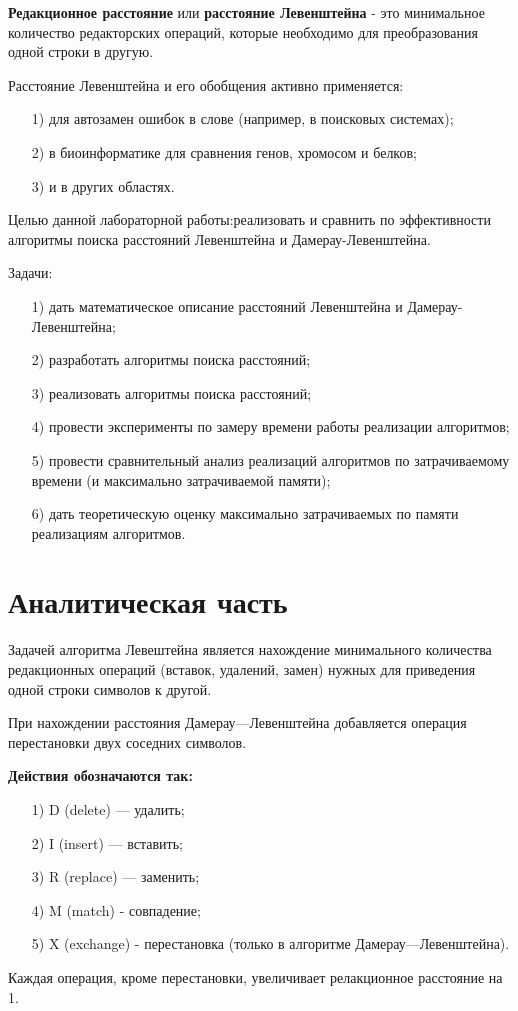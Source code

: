 \documentclass[12pt]{report}
\begin{document}
	\textbf{Редакционное расстояние} или \textbf{расстояние Левенштейна} - это минимальное количество редакторских операций, которые необходимо для преобразования одной строки в другую.
	
	Расстояние Левенштейна и его обобщения активно применяется: 
	\begin{enumerate}
		\item[1)] для автозамен ошибок в слове (например, в поисковых системах);
		\item[2)] в биоинформатике для сравнения генов, хромосом и белков;
		\item[3)] и в других областях.
	\end{enumerate}
	
	Целью данной лабораторной работы:реализовать и сравнить по эффективности алгоритмы поиска расстояний Левенштейна и Дамерау-Левенштейна.
	
	Задачи:
	\begin{enumerate}
		\item[1)] дать математическое описание расстояний Левенштейна и Дамерау-Левенштейна;
		\item[2)] разработать алгоритмы поиска расстояний;
		\item[3)] реализовать алгоритмы поиска расстояний;
		\item[4)] провести эксперименты по замеру времени работы реализации алгоритмов;
		\item[5)] провести сравнительный анализ реализаций алгоритмов по затрачиваемому времени (и максимально затрачиваемой памяти);
		\item[6)] дать теоретическую оценку максимально затрачиваемых по памяти реализациям алгоритмов.
	\end{enumerate}
	
	\chapter{Аналитическая часть} 
	Задачей алгоритма Левештейна является нахождение минимального количества редакционных операций (вставок, удалений, замен) нужных для приведения одной строки символов к другой.
	
	При нахождении расстояния Дамерау—Левенштейна добавляется операция перестановки двух соседних символов. 
	
	\textbf{Действия обозначаются так:} 
	\begin{enumerate}
		\item[1)] D (delete) — удалить;
		\item[2)] I (insert) — вставить;
		\item[3)] R (replace) — заменить;
		\item[4)] M (match) - совпадение;
		\item[5)] X (exchange) - перестановка (только в алгоритме Дамерау—Левенштейна).
	\end{enumerate}
Каждая операция, кроме перестановки, увеличивает релакционное расстояние на 1.
\end{document}
